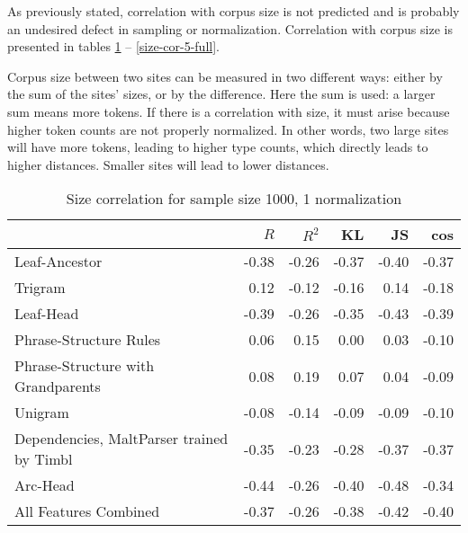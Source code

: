 As previously stated, correlation with corpus size is not predicted and is probably
an undesired defect in sampling or normalization. Correlation with
corpus size is presented in tables \ref{size-cor-1-1000} --
\ref{size-cor-5-full}.

Corpus size between two sites can be measured in two different ways:
either by the sum of the sites' sizes, or by the difference. Here
the sum is used: a larger sum means more tokens. If there is a
correlation with size, it must arise because higher token counts are
not properly normalized. In other words, two large sites will
have more tokens, leading to higher type counts, which directly leads
to higher distances. Smaller sites will lead to lower distances.

\begin{table}
\begin{tabular}{l|rrrrr}
& $R$ & $R^2$ & KL & JS & cos  \\ \hline
  Leaf-Ancestor&-0.38 & -0.26 & -0.37 & -0.40 & -0.37\\
  Trigram&0.12 & -0.12 & -0.16 & 0.14 & -0.18\\
  Leaf-Head&-0.39 & -0.26 & -0.35 & -0.43 & -0.39\\
  Phrase-Structure Rules&0.06 & 0.15 & 0.00 & 0.03 & -0.10\\
  Phrase-Structure with Grandparents&0.08 & 0.19 & 0.07 & 0.04 & -0.09\\
  Unigram&-0.08 & -0.14 & -0.09 & -0.09 & -0.10\\
  Dependencies, MaltParser trained by Timbl&-0.35 & -0.23 & -0.28 & -0.37 & -0.37\\
  Arc-Head&-0.44 & -0.26 & -0.40 & -0.48 & -0.34\\
  All Features Combined&-0.37 & -0.26 & -0.38 & -0.42 & -0.40\\
\end{tabular}
\caption{Size correlation for sample size 1000, 1 normalization}
\label{size-cor-1-1000}
\end{table}

